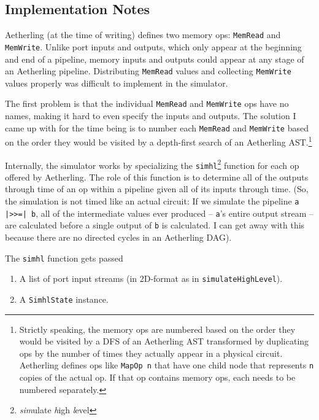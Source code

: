 \documentclass[12pt]{article}
\begin{document}
\subsection{Implementation Notes}

Aetherling (at the time of writing) defines two memory ops:
\texttt{MemRead} and \texttt{MemWrite}. Unlike port inputs and
outputs, which only appear at the beginning and end of a pipeline,
memory inputs and outputs could appear at any stage of an Aetherling
pipeline. Distributing \texttt{MemRead} values and collecting
\texttt{MemWrite} values properly was difficult to implement in the
simulator.

The first problem is that the individual \texttt{MemRead} and
\texttt{MemWrite} ops have no names, making it hard to even specify
the inputs and outputs. The solution I came up with for the time being
is to number each \texttt{MemRead} and \texttt{MemWrite} based on the
order they would be visited by a depth-first search of an Aetherling
AST.\footnote{Strictly speaking, the memory ops are numbered based on
  the order they would be visited by a DFS of an Aetherling AST
  transformed by duplicating ops by the number of times they actually
  appear in a physical circuit. Aetherling defines ops like
  \texttt{MapOp n} that have one child node that represents \texttt{n}
  copies of the actual op. If that op contains memory ops, each needs
  to be numbered separately.}

Internally, the simulator works by specializing the
\texttt{simhl}\footnote{ \textit{sim}ulate \textit{h}igh
  \textit{l}evel} function for each op offered by Aetherling.  The
role of this function is to determine all of the outputs through time
of an op within a pipeline given all of its inputs through time. (So,
the simulation is not timed like an actual circuit: If we simulate the
pipeline \texttt{a |>>=| b}, all of the intermediate values ever
produced -- \texttt{a}'s entire output stream -- are calculated before
a single output of \texttt{b} is calculated.  I can get away with this
because there are no directed cycles in an Aetherling DAG).

The \texttt{simhl} function gets passed

\begin{enumerate}
\item A list of port input streams (in 2D-format as in \texttt{simulateHighLevel}).
\item A \texttt{SimhlState} instance.
\end{enumerate}
\end{document}

